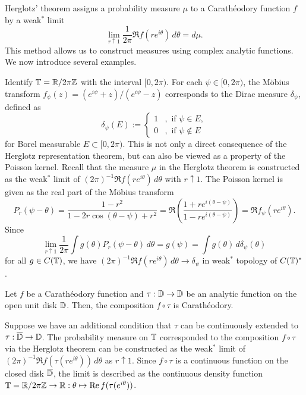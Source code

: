 \documentclass{../../small}
\begin{document}
Herglotz' theorem assigns a probability measure $\mu$ to a Carath\'eodory function $f$ by a weak$^*$ limit
\[\lim_{r\uparrow1}\frac1{2\pi}\Re f(re^{i\theta})\,d\theta=d\mu.\]
This method allows us to construct measures using complex analytic functions.
We now introduce several examples.

\begin{ex}
Identify $\mathbb{T}=\mathbb{R}/2\pi\mathbb{Z}$ with the interval $[0,2\pi)$.
For each $\psi\in[0,2\pi)$, the M\"obius transform $f_\psi(z)=(e^{i\psi}+z)/(e^{i\psi}-z)$ corresponds to the Dirac measure $\delta_\psi$, defined as
\[\delta_\psi(E):=\begin{cases}1&,\text{ if }\psi\in E,\\0&,\text{ if }\psi\notin E\end{cases}\]
for Borel measurable $E\subset[0,2\pi)$.
This is not only a direct consequence of the Herglotz representation theorem, but can also be viewed as a property of the Poisson kernel.
Recall that the measure $\mu$ in the Herglotz theorem is constructed as the weak$^*$ limit of $(2\pi)^{-1}\Re f(re^{i\theta})\,d\theta$ with $r\uparrow1$.
The Poisson kernel is given as the real part of the M\"obius transform
\[P_r(\psi-\theta)=\frac{1-r^2}{1-2r\cos(\theta-\psi)+r^2}=\Re\left(\frac{1+re^{i(\theta-\psi)}}{1-re^{i(\theta-\psi)}}\right)=\Re f_\psi(re^{i\theta}).\]
Since
\[\lim_{r\uparrow1}\frac1{2\pi}\int g(\theta)P_r(\psi-\theta)\,d\theta=g(\psi)=\int g(\theta)\,d\delta_\psi(\theta)\]
for all $g\in C(\mathbb{T})$, we have $(2\pi)^{-1}\Re f(re^{i\theta})\,d\theta\to\delta_\psi$ in weak$^*$ topology of $C(\mathbb{T})^*$.
\end{ex}


\begin{ex}
Let $f$ be a Carath\'eodory function and $\tau:\mathbb{D}\to\mathbb{D}$ be an analytic function on the open unit disk $\mathbb{D}$.
Then, the composition $f\circ\tau$ is Carath\'eodory.

Suppose we have an additional condition that $\tau$ can be continuously extended to $\tau:\overline{\mathbb{D}}\to\mathbb{D}$.
The probability measure on $\mathbb{T}$ corresponded to the composition $f\circ\tau$ via the Herglotz theorem can be constructed as the weak$^*$ limit of $(2\pi)^{-1}\Re f(\tau(re^{i\theta}))\,d\theta$ as $r\uparrow1$.
Since $f\circ\tau$ is a continuous function on the closed disk $\overline{\mathbb{D}}$, the limit is described as the continuous density function $\mathbb{T}=\mathbb{R}/2\pi\mathbb{Z}\to\mathbb{R}:\theta\mapsto\operatorname{Re} f(\tau(e^{i\theta}))$.
\end{ex}
\end{document}
